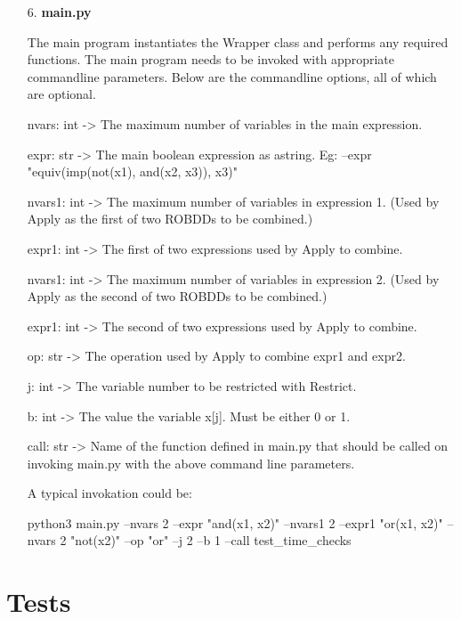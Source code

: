 \documentclass[a4paper, titlepage, 12pt]{article}
\numberwithin{equation}{section}
\begin{document}
\begin{itemize}
            \item[6.] \textbf{main.py}
            
                The main program instantiates the Wrapper class and performs any required functions.
                The main program needs to be invoked with appropriate commandline parameters.
                Below are the commandline options, all of which are optional.

                nvars: int -> The maximum number of variables in the main expression.
                
                expr: str -> The main boolean expression as astring. Eg: --expr "equiv(imp(not(x1), and(x2, x3)), x3)"
                
                nvars1: int -> The maximum number of variables in expression 1. (Used by Apply as the first of two ROBDDs to be combined.)
                
                expr1: int -> The first of two expressions used by Apply to combine.
                
                nvars1: int -> The maximum number of variables in expression 2. (Used by Apply as the second of two ROBDDs to be combined.)
                
                expr1: int -> The second of two expressions used by Apply to combine.
                
                op: str -> The operation used by Apply to combine expr1 and expr2.
                
                j: int -> The variable number to be restricted with Restrict.
                
                b: int -> The value the variable x[j]. Must be either 0 or 1.
                
                call: str -> Name of the function defined in main.py that should be called on invoking main.py with the above command line parameters.

                A typical invokation could be:

                python3 main.py --nvars 2 --expr "and(x1, x2)" --nvars1 2 --expr1 "or(x1, x2)" --nvars 2 "not(x2)" --op "or" --j 2 --b 1 --call test\_time\_checks

        \end{itemize}
        

    \section{Tests}
\end{document}
